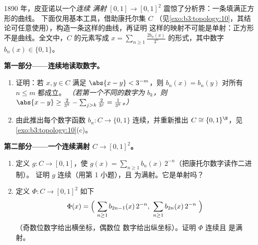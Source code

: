 \begin{problem}\label{pb:b3:topology:1}
1890 年，皮亚诺以一个\emph{连续
满射} $[0,1] \to [0,1]^2$ 震惊了分析界：一条填满正方形的曲线。
下面仅用基本工具，借助康托尔集 $C$
（见\cref{exo:b3:topology:10}，其结论可任意使用），构造一条这样的曲线，再证明
这样的映射不可能是单射：正方形
不是曲线。全文中，$C$ 的元素写成 $x =
\sum_{n \geq 1} \frac{2b_n(x)}{3^n}$ 的形式，其中数字 $b_n(x) \in
\{0, 1\}$。

\medskip
\noindent\textbf{第一部分——连续地读取数字。}
\begin{enumerate}
  \item 证明：若 $x, y \in C$ 满足 $\abs{x - y} <
        3^{-m}$，则 $b_n(x) = b_n(y)$ 对所有 $n \leq m$ 都成立。
        \emph{（若第一个不同的数字为 $b_k$，则
        $\abs{x - y} \geq \frac{2}{3^k} - \sum_{j>k}\frac2{3^j}
        = \frac1{3^k}$。）}
  \item 由此推出每个数字函数 $b_n \colon C \to \{0,
        1\}$ 连续，并重新推出 $C
        \cong \{0,1\}^\N$，见\cref{exo:b3:topology:10}(c)。
\end{enumerate}

\medskip
\noindent\textbf{第二部分——一个连续满射 $C \to
[0,1]^2$。}
\begin{enumerate}[resume]
  \item 定义 $g \colon C \to [0,1]$，使 $g(x) = \sum_{n\geq1}
        b_n(x)\,2^{-n}$（把康托尔数字读作二进制）。
        证明 $g$ 连续（用第 1 小题），且
        为满射。它是单射吗？
  \item 定义 $\Phi \colon C \to [0,1]^2$ 如下
        \[
        \Phi(x) = \Bigl(\ \sum_{n\geq1} b_{2n-1}(x)\,2^{-n},\
        \sum_{n\geq1} b_{2n}(x)\,2^{-n}\ \Bigr)
        \]
        （奇数位数字给出横坐标，偶数位
        数字给出纵坐标）。证明 $\Phi$ 连续且
        是满射。
\end{enumerate}


\end{problem}
